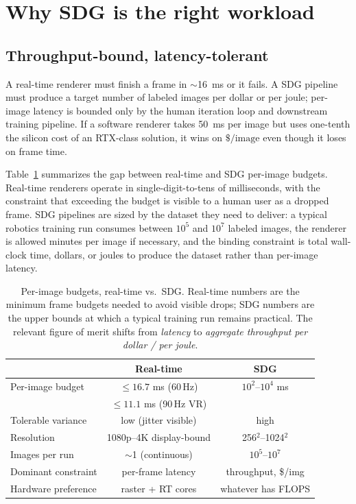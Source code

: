 \documentclass[10pt,journal]{IEEEtran}
\begin{document}
\section{Why SDG is the right workload}\label{sec:workload}

\subsection{Throughput-bound, latency-tolerant}

A real-time renderer must finish a frame in $\sim$16~ms or it fails.
A SDG pipeline must produce a target number of labeled images per dollar
or per joule; per-image latency is bounded only by the human iteration
loop and downstream training pipeline. If a software renderer takes
50~ms per image but uses one-tenth the silicon cost of an RTX-class
solution, it wins on $\$\slash\textrm{image}$ even though it loses on
frame time.

Table~\ref{tab:budgets} summarizes the gap between real-time and SDG
per-image budgets. Real-time renderers operate in single-digit-to-tens
of milliseconds, with the constraint that exceeding the budget is
visible to a human user as a dropped frame. SDG pipelines are sized by
the dataset they need to deliver: a typical robotics training run
consumes between $10^5$ and $10^7$ labeled images, the renderer is
allowed minutes per image if necessary, and the binding constraint is
total wall-clock time, dollars, or joules to produce the dataset
rather than per-image latency.

\begin{table}[t]
\centering
\caption{Per-image budgets, real-time vs.\ SDG. Real-time numbers are
the minimum frame budgets needed to avoid visible drops; SDG numbers
are the upper bounds at which a typical training run remains
practical. The relevant figure of merit shifts from \emph{latency} to
\emph{aggregate throughput per dollar / per joule}.}
\label{tab:budgets}
\small
\begin{tabular}{@{}lcc@{}}
\toprule
& \textbf{Real-time} & \textbf{SDG} \\
\midrule
Per-image budget         & $\leq 16.7$ ms (60\,Hz) & $10^2$--$10^4$ ms \\
                         & $\leq 11.1$ ms (90\,Hz VR)  & \\
Tolerable variance       & low (jitter visible)        & high \\
Resolution               & 1080p--4K display-bound     & 256$^2$--1024$^2$ \\
Images per run           & $\sim$1 (continuous)        & $10^5$--$10^7$ \\
Dominant constraint      & per-frame latency           & throughput, \$\slash img \\
Hardware preference      & raster + RT cores           & whatever has FLOPS \\
\bottomrule
\end{tabular}
\end{table}
\end{document}
